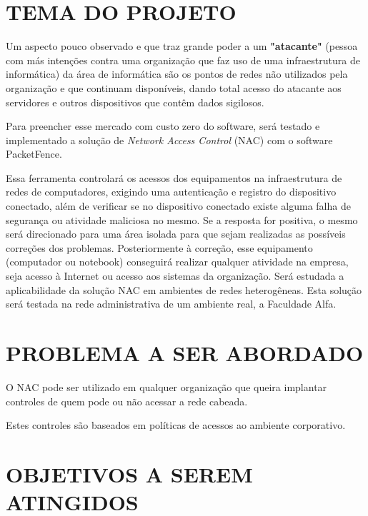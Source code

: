 \documentclass[brazil, ruledheader, pnumromarab,normaltoc]{abnt}
\begin{document}

\chapter{TEMA DO PROJETO}
Um aspecto pouco observado e que traz grande poder a um \textbf{"atacante"} (pessoa com más intenções contra uma organização que faz uso de uma infraestrutura de informática) da área de informática são os pontos de redes não utilizados pela organização e que continuam disponíveis, dando total acesso do atacante aos servidores e outros dispositivos que contêm dados sigilosos.
\par
Para preencher esse mercado com custo zero do software, será testado e implementado a solução de \textit{Network Access Control} (NAC) com o software PacketFence.
\par
Essa ferramenta controlará os acessos dos equipamentos na infraestrutura de redes de computadores, exigindo uma autenticação e registro do dispositivo conectado, além de verificar se no dispositivo conectado existe alguma falha de segurança ou atividade maliciosa no mesmo. Se a resposta for positiva, o mesmo será direcionado para uma área isolada para que sejam realizadas as possíveis correções dos problemas. Posteriormente à correção, esse equipamento (computador ou notebook) conseguirá realizar qualquer atividade na empresa, seja acesso à Internet ou acesso aos sistemas da organização.
Será estudada a aplicabilidade da solução NAC em ambientes de redes heterogêneas. Esta solução será testada na rede administrativa de um ambiente real, a Faculdade Alfa.

\chapter{PROBLEMA A SER ABORDADO}
O NAC pode ser utilizado em qualquer organização que queira implantar controles de quem pode ou não acessar a rede cabeada.
\par
Estes controles são baseados em políticas de acessos ao ambiente corporativo.

\chapter{OBJETIVOS A SEREM ATINGIDOS}
\end{document}
